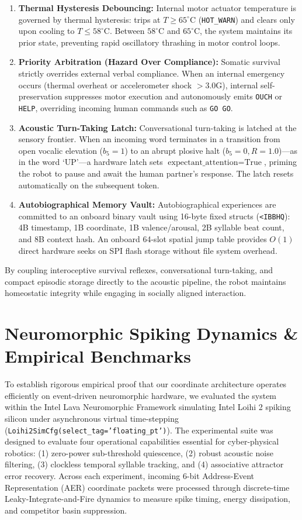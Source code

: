 \documentclass[journal,twocolumn]{IEEEtran}
\begin{document}
\begin{enumerate}
    \item \textbf{Thermal Hysteresis Debouncing:} Internal motor actuator temperature is governed by thermal hysteresis: trips at $T \ge 65^\circ\text{C}$ (\texttt{HOT\_WARN}) and clears only upon cooling to $T \le 58^\circ\text{C}$. Between $58^\circ\text{C}$ and $65^\circ\text{C}$, the system maintains its prior state, preventing rapid oscillatory thrashing in motor control loops.
    \item \textbf{Priority Arbitration (Hazard Over Compliance):} Somatic survival strictly overrides external verbal compliance. When an internal emergency occurs (thermal overheat or accelerometer shock $> 3.0\text{G}$), internal self-preservation suppresses motor execution and autonomously emits \texttt{OUCH} or \texttt{HELP}, overriding incoming human commands such as \texttt{GO GO}.
    \item \textbf{Acoustic Turn-Taking Latch:} Conversational turn-taking is latched at the sensory frontier. When an incoming word terminates in a transition from open vocalic elevation ($b_5 = 1$) to an abrupt plosive halt ($b_5 = 0, R = 1.0$)---as in the word `UP'---a hardware latch sets $\text{expectant\_attention} = \text{True}$, priming the robot to pause and await the human partner's response. The latch resets automatically on the subsequent token.
    \item \textbf{Autobiographical Memory Vault:} Autobiographical experiences are committed to an onboard binary vault using 16-byte fixed structs (\texttt{<IBBHQ}): 4B timestamp, 1B coordinate, 1B valence/arousal, 2B syllable beat count, and 8B context hash. An onboard 64-slot spatial jump table provides $O(1)$ direct hardware seeks on SPI flash storage without file system overhead.
\end{enumerate}

By coupling interoceptive survival reflexes, conversational turn-taking, and compact episodic storage directly to the acoustic pipeline, the robot maintains homeostatic integrity while engaging in socially aligned interaction.

\section{Neuromorphic Spiking Dynamics \& Empirical Benchmarks}
\label{sec:benchmarks}

To establish rigorous empirical proof that our coordinate architecture operates efficiently on event-driven neuromorphic hardware, we evaluated the system within the Intel Lava Neuromorphic Framework simulating Intel Loihi 2 spiking silicon under asynchronous virtual time-stepping (\texttt{Loihi2SimCfg(select\_tag='floating\_pt')}). The experimental suite was designed to evaluate four operational capabilities essential for cyber-physical robotics: (1) zero-power sub-threshold quiescence, (2) robust acoustic noise filtering, (3) clockless temporal syllable tracking, and (4) associative attractor error recovery. Across each experiment, incoming 6-bit Address-Event Representation (AER) coordinate packets were processed through discrete-time Leaky-Integrate-and-Fire dynamics to measure spike timing, energy dissipation, and competitor basin suppression.
\end{document}
